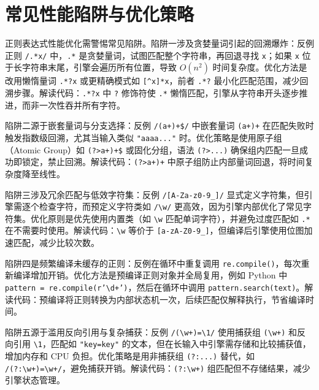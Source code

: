 \chapter{常见性能陷阱与优化策略}
正则表达式性能优化需警惕常见陷阱。陷阱一涉及贪婪量词引起的回溯爆炸：反例正则 \texttt{/.*x/} 中，\texttt{.*} 是贪婪量词，试图匹配整个字符串，再回退寻找 \texttt{x}；如果 \texttt{x} 位于长字符串末尾，引擎会遍历所有位置，导致 $O(n^2)$ 时间复杂度。优化方法是改用懒惰量词 \texttt{.*?x} 或更精确模式如 \texttt{[\^{}x]*x}，前者 \texttt{.*?} 最小化匹配范围，减少回溯步骤。解读代码：\texttt{.*?x} 中 \texttt{?} 修饰符使 \texttt{.*} 懒惰匹配，引擎从字符串开头逐步推进，而非一次性吞并所有字符。\par
陷阱二源于嵌套量词与分支选择：反例 \texttt{/(a+)+\${}/} 中嵌套量词 \texttt{(a+)+} 在匹配失败时触发指数级回溯，尤其当输入类似 \texttt{"aaaa..."} 时。优化策略是使用原子组（Atomic Group）如 \texttt{(?>a+)+\${}} 或固化分组，语法 \texttt{(?>...)} 确保组内匹配一旦成功即锁定，禁止回溯。解读代码：\texttt{(?>a+)+} 中原子组防止内部量词回退，将时间复杂度降至线性。\par
陷阱三涉及冗余匹配与低效字符集：反例 \texttt{/[A-Za-z0-9\_{}]/} 显式定义字符集，但引擎需逐个检查字符，而预定义字符类如 \texttt{/\textbackslash{}w/} 更高效，因为引擎内部优化了常见字符集。优化原则是优先使用内置类（如 \texttt{\textbackslash{}w} 匹配单词字符），并避免过度匹配如 \texttt{.*} 在不需要时使用。解读代码：\texttt{\textbackslash{}w} 等价于 \texttt{[a-zA-Z0-9\_{}]}，但编译后引擎使用位图加速匹配，减少比较次数。\par
陷阱四是频繁编译未缓存的正则：反例在循环中重复调用 \texttt{re.compile()}，每次重新编译增加开销。优化方法是预编译正则对象并全局复用，例如 Python 中 \texttt{pattern = re.compile(r'\textbackslash{}d+')}，然后在循环中调用 \texttt{pattern.search(text)}。解读代码：预编译将正则转换为内部状态机一次，后续匹配仅解释执行，节省编译时间。\par
陷阱五源于滥用反向引用与复杂捕获：反例 \texttt{/(\textbackslash{}w+)=\textbackslash{}1/} 使用捕获组 \texttt{(\textbackslash{}w+)} 和反向引用 \texttt{\textbackslash{}1}，匹配如 \texttt{"key=key"} 的文本，但在长输入中引擎需存储和比较捕获值，增加内存和 CPU 负担。优化策略是用非捕获组 \texttt{(?:...)} 替代，如 \texttt{/(?:\textbackslash{}w+)=\textbackslash{}w+/}，避免捕获开销。解读代码：\texttt{(?:\textbackslash{}w+)} 组匹配但不存储结果，减少引擎状态管理。\par
